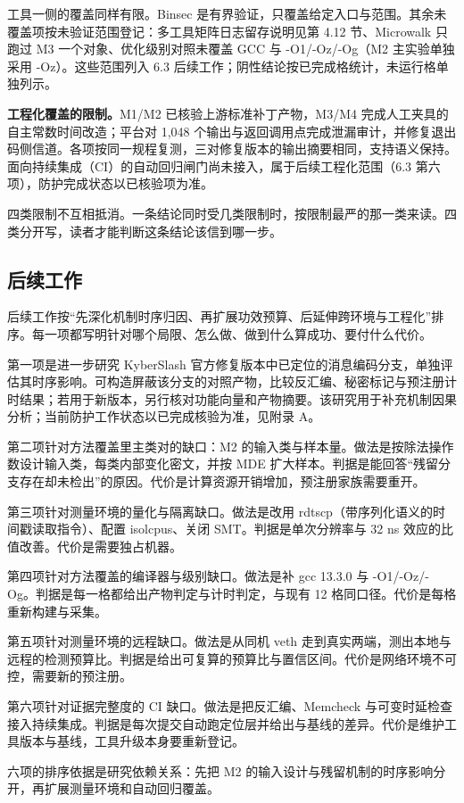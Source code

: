 工具一侧的覆盖同样有限。Binsec\cite{binsec} 是有界验证，只覆盖给定入口与范围。其余未覆盖项按未验证范围登记：多工具矩阵日志留存说明见第 4.12 节、Microwalk 只跑过 M3 一个对象、优化级别对照未覆盖 GCC 与 -O1/-Oz/-Og（M2 主实验单独采用 -Oz）。这些范围列入 6.3 后续工作；阴性结论按已完成格统计，未运行格单独列示。%

\textbf{工程化覆盖的限制。}M1/M2 已核验上游标准补丁产物，M3/M4 完成人工夹具的自主常数时间改造；平台对 1,048 个输出与返回调用点完成泄漏审计，并修复退出码侧信道。各项按同一规程复测，三对修复版本的输出摘要相同，支持语义保持。面向持续集成（CI）的自动回归闸门尚未接入，属于后续工程化范围（6.3 第六项），防护完成状态以已核验项为准。%

四类限制不互相抵消。一条结论同时受几类限制时，按限制最严的那一类来读。四类分开写，读者才能判断这条结论该信到哪一步。

\subsection{后续工作}

后续工作按“先深化机制时序归因、再扩展功效预算、后延伸跨环境与工程化”排序。每一项都写明针对哪个局限、怎么做、做到什么算成功、要付什么代价。

第一项是进一步研究 KyberSlash 官方修复版本中已定位的消息编码分支，单独评估其时序影响。可构造屏蔽该分支的对照产物，比较反汇编、秘密标记与预注册计时结果；若用于新版本，另行核对功能向量和产物摘要。该研究用于补充机制因果分析；当前防护工作状态以已完成核验为准，见附录 A。%

第二项针对方法覆盖里主类对的缺口：M2 的输入类与样本量。做法是按除法操作数设计输入类，每类内部变化密文，并按 MDE 扩大样本。判据是能回答“残留分支存在却未检出”的原因。代价是计算资源开销增加，预注册家族需要重开。%

第三项针对测量环境的量化与隔离缺口。做法是改用 rdtscp（带序列化语义的时间戳读取指令）、配置 isolcpus、关闭 SMT。判据是单次分辨率与 32 ns 效应的比值改善。代价是需要独占机器。%

第四项针对方法覆盖的编译器与级别缺口。做法是补 gcc 13.3.0 与 -O1/-Oz/-Og。判据是每一格都给出产物判定与计时判定，与现有 12 格同口径。代价是每格重新构建与采集。%

第五项针对测量环境的远程缺口。做法是从同机 veth 走到真实两端，测出本地与远程的检测预算比。判据是给出可复算的预算比与置信区间。代价是网络环境不可控，需要新的预注册。%

第六项针对证据完整度的 CI 缺口。做法是把反汇编、Memcheck 与可变时延检查接入持续集成。判据是每次提交自动跑定位层并给出与基线的差异。代价是维护工具版本与基线，工具升级本身要重新登记。%

六项的排序依据是研究依赖关系：先把 M2 的输入设计与残留机制的时序影响分开，再扩展测量环境和自动回归覆盖。
